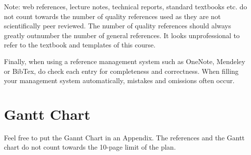 \documentclass[12pt, english, NoHyper]{AE4010-template}
\begin{document}
Note: web references, lecture notes, technical reports, standard textbooks etc. do not count towards the number of quality references used as they are not scientifically peer reviewed. The number of quality references should always greatly outnumber the number of general references. It looks unprofessional to refer to the textbook and templates of this course.

Finally, when using a reference management system such as OneNote, Mendeley or BibTex, do check each entry for completeness and correctness. When filling your management system automatically, mistakes and omissions often occur. \newline


\appendix




\section{Gantt Chart}
Feel free to put the Gannt Chart in an Appendix. The references and the Gantt chart do not count towards the 10-page limit of the plan.
\end{document}
